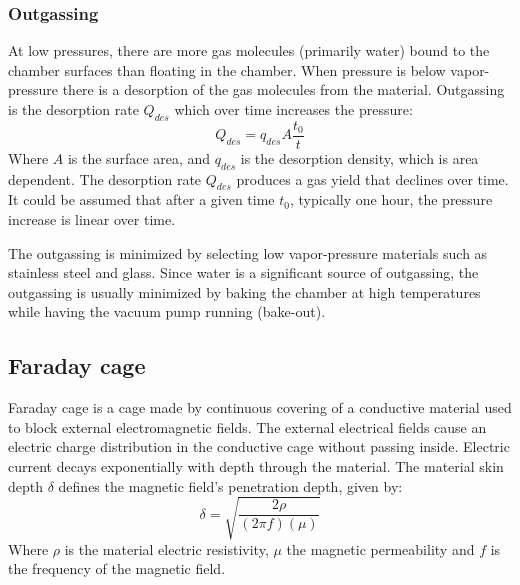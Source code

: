 \documentclass[\main/master.tex]{subfiles}
\begin{document}

\subsubsection{Outgassing}
\par\noindent
At low pressures, there are more gas molecules (primarily water) bound to the chamber surfaces than floating in the chamber. When pressure is below vapor-pressure there is a desorption of the gas molecules from the material. Outgassing is the desorption rate $Q_{des}$ which over time increases the pressure:
\begin{equation}
Q_{des} = q_{des} A\frac{t_0}{t}  \label{eqn:desorption rate}
\end{equation}
Where $A$ is the surface area, and $q_{des}$ is the desorption density, which is area dependent. The desorption rate $Q_{des}$ produces a gas yield that declines over time. It could be assumed that after a given time $t_0$, typically one hour, the pressure increase is linear over time.
\par\noindent
The outgassing is minimized by selecting low vapor-pressure materials such as stainless steel and glass. Since water is a significant source of outgassing, the outgassing is usually minimized by baking the chamber at high temperatures while having the vacuum pump running (bake-out).
\subsection{Faraday cage}
\par\noindent
Faraday cage is a cage made by continuous covering of a conductive material used to block external electromagnetic fields. The external electrical fields cause an electric charge distribution in the conductive cage without passing inside. Electric current decays exponentially with depth through the material. The material skin depth $\delta$ defines the magnetic field's penetration depth, given by:
\begin{equation}
\delta = \sqrt{\frac{2\rho}{(2\pi f)(\mu)} }    \label{eqn:skin depth}
\end{equation}
Where $\rho$ is the material electric resistivity, $\mu$ the magnetic permeability and $f$ is the frequency of the magnetic field.
\end{document}
